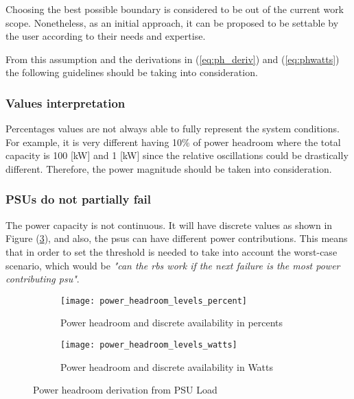 Choosing the best possible boundary is considered to be out of the current work scope. Nonetheless, as an initial approach, it can be proposed to be settable by the user according to their needs and expertise. 

From this assumption and the derivations in (\ref{eq:ph_deriv}) and (\ref{eq:phwatts}) the following guidelines should be taking into consideration. 

\subsubsection*{Values interpretation}

Percentages values are not always able to fully represent the system conditions. For example, it is very different having 10\% of power headroom where the total capacity is 100 [kW] and 1 [kW] since the relative oscillations could be drastically different. Therefore, the power magnitude should be taken into consideration. 

\subsubsection*{PSUs do not partially fail}

The power capacity is not continuous. It will have discrete values as shown in Figure (\ref{fig:ph_lvls}), and also, the \acp{psu} can have different power contributions. This means that in order to set the threshold is needed to take into account the worst-case scenario, which would be \emph{"can the \ac{rbs} work if the next failure is the most power contributing \ac{psu}"}.


\begin{figure}[hptb]
	\centering
	\begin{subfigure}{.6\textwidth}
		\centering
		\texttt{[image: power\_headroom\_levels\_percent]}
		\caption{Power headroom and discrete availability in percents}
		\label{fig:ph_lvls_percent}
	\end{subfigure}%
	\hfill
	\begin{subfigure}{.6\textwidth}
		\centering
		\texttt{[image: power\_headroom\_levels\_watts]}
		\caption{Power headroom and discrete availability in Watts}
		\label{fig:ph_lvls_watts}
	\end{subfigure}
	\caption{Power headroom derivation from PSU Load}
	\label{fig:ph_lvls}
\end{figure}

\pagebreak

